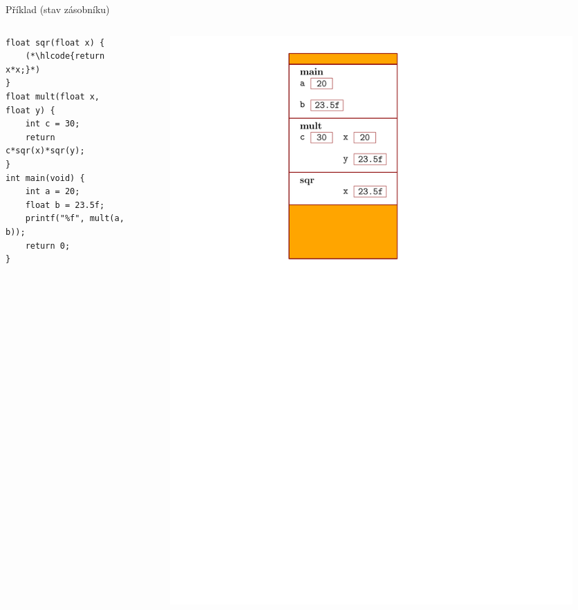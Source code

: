 \documentclass[14pt,aspectratio=169]{beamer}
\begin{document}
    \begin{frame}[t,fragile]{Příklad (stav zásobníku)}
        \begin{columns}[onlytextwidth]
            \begin{column}{0.55\textwidth}
                \begin{lstlisting}
float sqr(float x) {
    (*\hlcode{return x*x;}*)
}
float mult(float x, float y) {
    int c = 30;
    return c*sqr(x)*sqr(y);
}
int main(void) {
    int a = 20;
    float b = 23.5f;
    printf("%f", mult(a, b));
    return 0;
}
                \end{lstlisting}
            \end{column}
            \begin{column}{0.4\textwidth}
                \begin{figure}
                    \centering
                    \includegraphics[scale=.6]{images/zasobnik_stav_9.pdf}
                \end{figure}
            \end{column}
        \end{columns}
    \end{frame}
\end{document}
